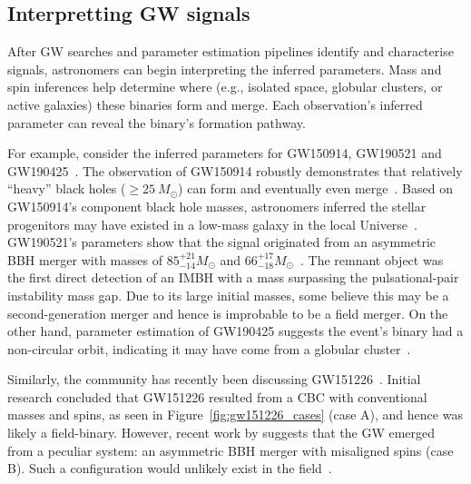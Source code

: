 \subsection{Interpretting GW signals}

After GW searches and parameter estimation pipelines identify and characterise signals, astronomers can begin interpreting the inferred parameters.
Mass and spin inferences help determine where (e.g., isolated space, globular clusters, or active galaxies) these binaries form and merge.
Each observation's inferred parameter can reveal the binary's formation pathway.


For example, consider the inferred parameters for GW150914, GW190521 and GW190425~\cite{abbott2016observation, gw190521,gw190425}. 
The observation of GW150914 robustly demonstrates that relatively ``heavy'' black holes ($\geq25\ M_{\odot}$) can form and eventually even merge~\cite{gw150914_asto_implications}.
Based on GW150914's component black hole masses, astronomers inferred the stellar progenitors may have existed in a low-mass galaxy in the local Universe~\cite{gw150914_asto_implications}. 
GW190521's parameters show that the signal originated from an asymmetric BBH merger with masses of $85^{+21}_{-14}M_{\odot}$ and $66^{+17}_{-18}M_{\odot}$~\cite{gw190521}.
The remnant object was the first direct detection of an IMBH with a mass surpassing the pulsational-pair instability mass gap.
Due to its large initial masses, some believe this may be a second-generation merger and hence is improbable to be a field merger. 
On the other hand,  parameter estimation of GW190425 suggests the event's binary had a non-circular orbit, indicating it may have come from a globular cluster~\cite{Romero-Shaw:2020:MNRAS}.

Similarly, the community has recently been discussing GW151226~\cite{Chia:2022:PhRvD, Mateu-Lucena:2021:arXiv, Nitz:2021:ApJ}. 
Initial research concluded that GW151226 resulted from a CBC with conventional masses and spins, as seen in Figure~\ref{fig:gw151226_cases} (case A), and hence was likely a field-binary.
However, recent work by \citet{Chia:2022:PhRvD} suggests that the GW emerged from a peculiar system: an asymmetric BBH merger with misaligned  spins (case B). Such a configuration would unlikely exist in the field~\cite{Chia:2022:PhRvD}.

